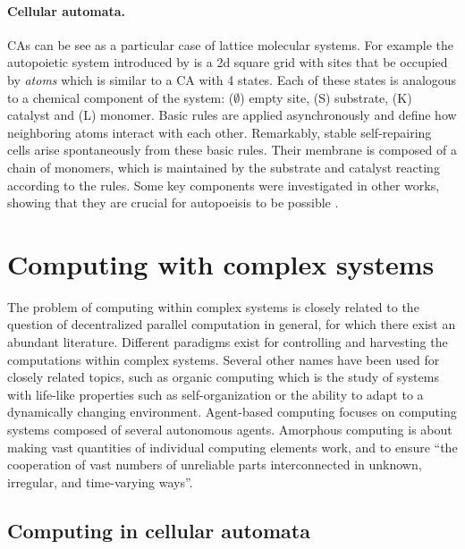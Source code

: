 \paragraph{Cellular automata.}
\Acfp{CA} can be see as a particular case of lattice molecular systems. For
example the autopoietic system introduced by
\textcite{varelaAutopoiesisOrganizationLiving1991} is a 2d square grid with sites
that be occupied by \emph{atoms} which is similar to a \ac{CA} with 4 states.
Each of these states is analogous to a chemical component of the system: ($\emptyset$)
empty site, (S) substrate, (K) catalyst and (L) monomer. Basic rules are applied
asynchronously and define how neighboring atoms interact with each other.
Remarkably, stable self-repairing cells arise spontaneously from these basic
rules. Their membrane is composed of a chain of monomers, which is maintained by
the substrate and catalyst reacting according to the rules. Some key components
were investigated in other works, showing that they are crucial for autopoeisis
to be possible \parencite{zelenySelforganizationLivingSystems1977,
  mcmullinRediscoveringComputationalAutopoiesis1997}.

\section{Computing with complex systems}\label{sec:comp-with-compl}

The problem of computing within complex systems is closely related to the
question of decentralized parallel computation in general, for which there exist
an abundant literature. Different paradigms exist for controlling and harvesting
the computations within complex systems. Several other names have been used for
closely related topics, such as organic computing
\parencite{muller-schloerOrganicComputingParadigm2011} which is the study of
systems with life-like properties such as self-organization or the ability to
adapt to a dynamically changing environment. Agent-based computing
\parencite{jenningsAgentBasedComputingPromise1999} focuses on computing systems
composed of several autonomous agents. Amorphous computing
\parencite{abelsonAmorphousComputing2000,
  nagpalProgrammablePatternFormationScaleIndependence2008,
  nagpalProgrammableSelfassemblyUsing2002} is about making vast quantities of
individual computing elements work, and to ensure ``the cooperation of vast
numbers of unreliable parts interconnected in unknown, irregular, and
time-varying ways''.

\subsection{Computing in cellular automata}\label{sec:comp-cell-autom}

